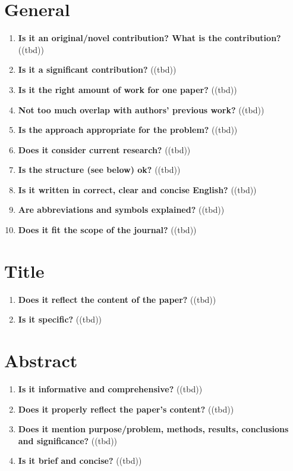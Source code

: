 \section{General}\label{sec:general}
\begin{enumerate}[resume]
    \item \textbf{Is it an original/novel contribution? What is the contribution?} \textcolor{HighlightColor}{((tbd))}
    \item \textbf{Is it a significant contribution?} 	\textcolor{HighlightColor}{((tbd))}
    \item \textbf{Is it the right amount of work for one paper?} 	\textcolor{HighlightColor}{((tbd))}
    \item \textbf{Not too much overlap with authors’ previous work?} 	\textcolor{HighlightColor}{((tbd))}
    \item \textbf{Is the approach appropriate for the problem?} 	\textcolor{HighlightColor}{((tbd))}
    \item \textbf{Does it consider current research?} 	\textcolor{HighlightColor}{((tbd))}
    \item \textbf{Is the structure (see below) ok?} 	\textcolor{HighlightColor}{((tbd))}
    \item \textbf{Is it written in correct, clear and concise English?} 	\textcolor{HighlightColor}{((tbd))}
    \item \textbf{Are abbreviations and symbols explained?} 	\textcolor{HighlightColor}{((tbd))}
    \item \textbf{Does it fit the scope of the journal?} 	\textcolor{HighlightColor}{((tbd))}
\end{enumerate}

\section{Title}\label{sec:title}
\begin{enumerate}[resume]
    \item \textbf{Does it reflect the content of the paper?} 	\textcolor{HighlightColor}{((tbd))}
    \item \textbf{Is it specific?} 	\textcolor{HighlightColor}{((tbd))}
\end{enumerate}

\section{Abstract}\label{sec:abstract}
\begin{enumerate}[resume]
    \item \textbf{Is it informative and comprehensive?} 	\textcolor{HighlightColor}{((tbd))}
    \item \textbf{Does it properly reflect the paper’s content?} 	\textcolor{HighlightColor}{((tbd))}
    \item \textbf{Does it mention purpose/problem, methods, results, conclusions and significance?} 	\textcolor{HighlightColor}{((tbd))}
    \item \textbf{Is it brief and concise?} 	\textcolor{HighlightColor}{((tbd))}
\end{enumerate}

